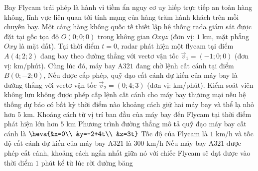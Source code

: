 \begin{ex}%
	Bay Flycam trái phép là hành vi tiềm ẩn nguy cơ uy hiếp trực tiếp an toàn hàng không, lĩnh vực liên quan tới tính mạng của hàng trăm hành khách trên mỗi chuyến bay. Một cảng hàng không quốc tế thiết lập hệ thống rada giám sát được đặt tại gốc tọa độ $O(0;0;0)$ trong không gian $Oxyz$ (đơn vị: $1$ km, mặt phẳng $Oxy$ là mặt đất). Tại thời điểm $t=0$, radar phát hiện một flycam tại điểm $A(4;2;2)$ đang bay theo đường thẳng với vectơ vận tốc $\overrightarrow{v}_1=(-1;0;0)$ (đơn vị: km/phút). Cùng lúc đó, máy bay A$321$ đang chờ lệnh cất cánh tại điểm $B(0;-2;0)$, Nếu được cấp phép, quỹ đạo cất cánh dự kiến của máy bay là đường thẳng với vectơ vận tốc $\overrightarrow{v}_2=(0;4;3)$ (đơn vị: km/phút). Kiểm soát viên không lưu không được phép cấp lệnh cất cánh cho máy bay thương mại nếu hệ thống dự báo có bất kỳ thời điểm nào khoảng cách giữ hai máy bay và thể lạ nhỏ hơn $5$ km.
	\choiceTF
	{\True Khoảng cách từ vị trí ban đầu của máy bay đến Flycam tại thời điểm phát hiện lớn hơn $5$ km}
	{\True Phương trình đường thẳng mô tả quỹ đạo máy bay cất cánh là $\heva{&x=0\\ &y=-2+4t\\ &z=3t}$}
	{Tốc độ của Flycam là $1$ km/h và tốc độ cất cánh dự kiến của máy bay A$321$ là $300$ km/h}
	{\True Nếu máy bay A$321$ được phép cất cánh, khoảng cách ngắn nhất giữa nó với chiếc Flycam sẽ đạt được vào thời điểm $1$ phút kể từ lúc rời đường băng}
\end{ex}
